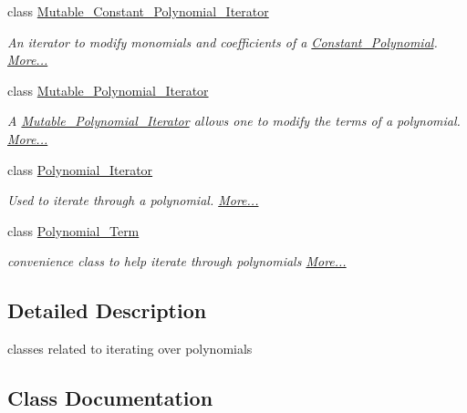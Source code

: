 \begin{DoxyCompactItemize}
class \hyperlink{group___iterator_group_class_mutable___constant___polynomial___iterator}{Mutable\+\_\+\+Constant\+\_\+\+Polynomial\+\_\+\+Iterator}
\begin{DoxyCompactList}\small\item\em An iterator to modify monomials and coefficients of a \hyperlink{group__polygroup_class_constant___polynomial}{Constant\+\_\+\+Polynomial}.  \hyperlink{group___iterator_group_class_mutable___constant___polynomial___iterator}{More...}\end{DoxyCompactList}\item 
class \hyperlink{group___iterator_group_class_mutable___polynomial___iterator}{Mutable\+\_\+\+Polynomial\+\_\+\+Iterator}
\begin{DoxyCompactList}\small\item\em A \hyperlink{group___iterator_group_class_mutable___polynomial___iterator}{Mutable\+\_\+\+Polynomial\+\_\+\+Iterator} allows one to modify the terms of a polynomial.  \hyperlink{group___iterator_group_class_mutable___polynomial___iterator}{More...}\end{DoxyCompactList}\item 
class \hyperlink{group___iterator_group_class_polynomial___iterator}{Polynomial\+\_\+\+Iterator}
\begin{DoxyCompactList}\small\item\em Used to iterate through a polynomial.  \hyperlink{group___iterator_group_class_polynomial___iterator}{More...}\end{DoxyCompactList}\item 
class \hyperlink{group___iterator_group_class_polynomial___term}{Polynomial\+\_\+\+Term}
\begin{DoxyCompactList}\small\item\em convenience class to help iterate through polynomials  \hyperlink{group___iterator_group_class_polynomial___term}{More...}\end{DoxyCompactList}\end{DoxyCompactItemize}


\subsection{Detailed Description}
classes related to iterating over polynomials 



\subsection{Class Documentation}
\label{class_constant___polynomial___iterator}
